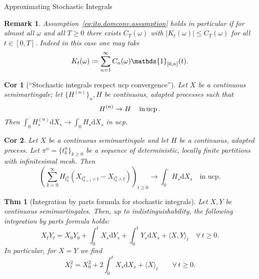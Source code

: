 \documentclass[a4paper]{article}
\theoremstyle{mytheoremstyle}
\newtheorem{theorem}{Thm}
\newtheorem{corollary}{Cor}[theorem]
\newtheorem*{remark}{Remark}
\newcommand{\1}{\mathds{1}}
\begin{document}
\begin{multicols*}{3}
\begin{roundbox}{Approximating Stochastic Integrals}
\begin{remark}
  \label{rem:ito.comconv}Assumption~\eqref{eq:ito.domconv.assumption} holds in
  particular if for almost all $\omega$ and all $T \geqslant 0$ there exists
  $C_T (\omega)$ with $| K_t (\omega) | \leqslant C_T (\omega)$ for all $t \in
  [0, T]$. Indeed in this case one may take
  \vspace{-0.5em}
  \[
    K_t (\omega) \coloneq \sum_{n = 1}^{\infty} C_n (\omega)  \1_{[0, n]} (t) .
  \vspace{-0.5em}
  \]
\end{remark}

\begin{corollary}[``Stochastic integrals respect ucp convergence'']
  \label{cor:stoch.integr.respects.ucp}Let $X$ be a continuous semimartingale;
  let $\{ H^{(n)} \}_n, H$ be continuous, adapted processes such that
  \vspace{-0.5em}
  \[
    H^{(n)} \to H \quad \operatorname{in} \operatorname{ucp} .
  \vspace{-0.5em}
  \]
  Then $\int_0^{\cdot} H^{(n)}_s \mathrm{d} X_s \rightarrow \int_0^{\cdot} H_s
  \mathrm{d} X_s$ in ucp.
\end{corollary}

\begin{corollary}
  \label{cor:ito-domconv}Let $X$ be a continuous semimartingale and let $H$ be
  a continuous, adapted process. Let $\pi^n = \{ t^n_k \}_{k \geqslant 0}$ be
  a sequence of deterministic, locally finite partitions with infinitesimal
  mesh. Then
  \[
    \left( \sum_{k = 0}^{\infty} H_{t_k^n} \left(X_{t^n_{k + 1} \wedge t} -
     X_{t^n_k \wedge t} \right) \right)_{t \ge 0} \longrightarrow \int_0^{\cdot}
     H_s \mathrm{d} X_s \quad \text{in ucp} .
  \]
\end{corollary}

\begin{theorem}[Integration by parts formula for stochastic integrals]
  \label{thm:IBP.stochint}Let $X, Y$ be continuous semimartingales. Then, up
  to indistinguishability, the following {\emph{integration by parts}} formula
  holds:
  \begin{equation}
    X_t Y_t = X_0 Y_0 + \int_0^t X_s \mathrm{d} Y_s + \int_0^t Y_s \mathrm{d} X_s +
    \langle X, Y \rangle_t \quad \forall \, t \geqslant 0.
    \label{eq:IBP.formula.stochint}
  \end{equation}
  In particular, for $X = Y$ we find
  \begin{equation}
    X^2_t = X_0^2 + 2 \int_0^t X_s \mathrm{d} X_s + \langle X \rangle_t \qquad
    \forall \, t \geqslant 0. \label{eq:Ito.formula.square}
  \end{equation}
\end{theorem}
\end{roundbox}


\end{multicols*}
\end{document}
